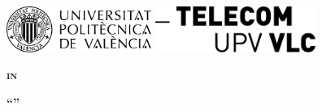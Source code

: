 % 
% 
% 


\thispagestyle{empty}

\setcounter{page}{1}




\begin{center}
    \includegraphics[height=15mm]{opening/resources/logos/logo_upv.pdf}
    \hfill
    \includegraphics[height=15mm]{opening/resources/logos/logo_upv_telcom.pdf}
\end{center}

\vspace*{30mm}

\begin{center}
    \textbf{\large \textsc{{\thesisDegree} in}}\\
    \textbf{\large \textsc{\thesisArea}}
\end{center}

\vspace*{0mm}

\begin{center}
    \textbf{\large \thesisType}
\end{center}

\vspace*{10mm}

\begin{center}
    \textbf{{\LARGE {}``\thesisTitle''}}\\
\end{center}

